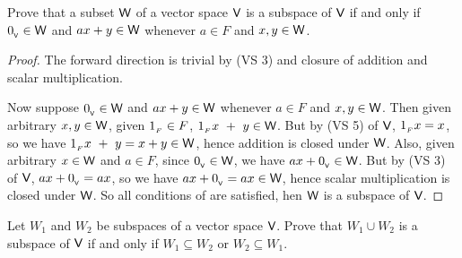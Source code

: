 \begin{exercise} \label{exercise 1.3.18}
Prove that a subset \(\textsf{W}\) of a vector space \(\textsf{V}\) is a subspace of \(\textsf{V}\) if and only if \(0_{_{\textsf{V}}} \in \textsf{W}\) and \(a x + y \in \textsf{W}\) whenever \(a \in F\) and \(x, y \in \textsf{W}\).
\end{exercise}

\begin{proof}
The forward direction is trivial by  (VS 3) and closure of addition and scalar multiplication.

Now suppose \(0_{_{\textsf{V}}} \in \textsf{W}\) and \(a x + y \in \textsf{W}\) whenever \(a \in F\) and \(x, y \in \textsf{W}\).
Then given arbitrary \(x, y \in \textsf{W}\), given \(1_{_F} \in F\), \(1_{_F} x\ +\ y \in \textsf{W}\).
But by (VS 5) of \(\textsf{V}\), \(1_{_F} x = x\), so we have \(1_{_F} x\ +\ y = x + y \in \textsf{W}\), hence addition is closed under \(\textsf{W}\).
Also, given arbitrary \(x \in \textsf{W}\) and \(a \in F\), since \(0_{_{\textsf{V}}} \in \textsf{W}\), we have \(ax + 0_{_{\textsf{V}}} \in \textsf{W}\).
But by (VS 3) of \(\textsf{V}\), \(ax + 0_{_{\textsf{V}}} = ax\), so we have \(ax + 0_{_{\textsf{V}}} = ax \in \textsf{W}\), hence scalar multiplication is closed under \(\textsf{W}\).
So all conditions of  are satisfied, hen \(\textsf{W}\) is a subspace of \(\textsf{V}\).
\end{proof}

\begin{exercise} \label{exercise 1.3.19}
Let \(W_1\) and \(W_2\) be subspaces of a vector space \(\textsf{V}\).
Prove that \(W_1 \cup W_2\) is a subspace of \(\textsf{V}\) if and only if \(W_1 \subseteq W_2\) or \(W_2 \subseteq W_1\).
\end{exercise}

